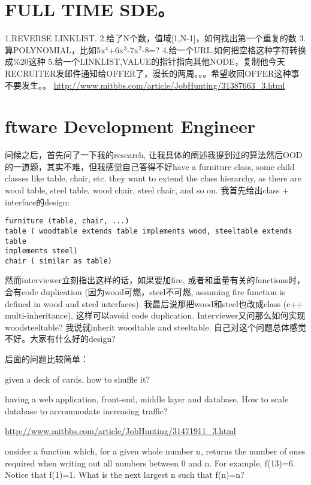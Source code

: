 \documentclass[12pt]{book}
\begin{document}
\chapter{FULL TIME SDE。}
\label{sec-24}
1.REVERSE LINKLIST.
2.给了N个数，值域[1,N-1]，如何找出第一个重复的数
3.算POLYNOMIAL，比如5x$^{\text{4}}$+6x$^{\text{3}}$-7x$^{\text{2}}$-8=?
4.给一个URL,如何把空格这种字符转换成\%20这种
5.给一个LINKLIST,VALUE的指针指向其他NODE，复制他今天RECRUITER发邮件通知给OFFER了，漫长的两周。。。希望收回OFFER这种事不要发生。。
\url{http://www.mitbbs.com/article/JobHunting/31387663_3.html}

\chapter{ftware Development Engineer}
\label{sec-25}
问候之后，首先问了一下我的research, 让我具体的阐述我提到过的算法然后OOD的一道题，其实不难，但我感觉自己答得不好have a furniture class, some child classes like table, chair, etc.
they want to extend the class hierarchy, as there are wood table, steel table, wood chair, steel chair, and so on.
我首先给出class + interface的design:
\lstset{language=java,label= ,caption= ,numbers=none}
\begin{lstlisting}
furniture (table, chair, ...)
table ( woodtable extends table implements wood, steeltable extends table 
implements steel)
chair ( similar as table)
\end{lstlisting}
然而interviewer立刻指出这样的话，如果要加fire, 或者和重量有关的functions时，会有code duplication (因为wood可燃，steel不可燃, assuming fire function is defined in wood and steel interfaces). 我最后说那把wood和steel也改成class (c++ multi-inheritance), 这样可以avoid code duplication. Interviewer又问那么如何实现woodsteeltable? 我说就inherit woodtable and steeltable. 自己对这个问题总体感觉不好。大家有什么好的design?

后面的问题比较简单：

given a deck of cards, how to shuffle it?

having a web application, front-end, middle layer and database. How to
scale database to accommodate increasing traffic?

\url{http://www.mitbbs.com/article/JobHunting/31471911_3.html}

onsider a function which, for a given whole number n, returns the
number of ones required when writing out all numbers between 0 and n. For example, f(13)=6. Notice that f(1)=1. What is the next largest n such that f(n)=n?
\end{document}
